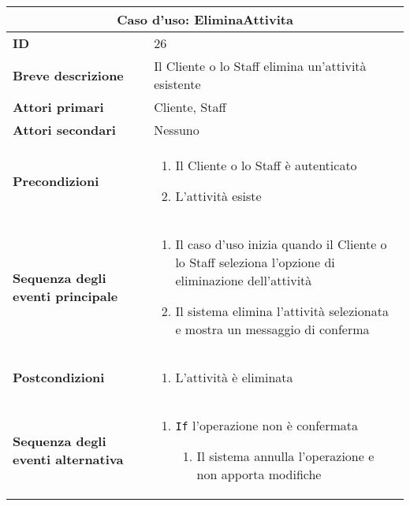 \documentclass[a4paper]{report}
\begin{document}
\clearpage
\begin{table}[H]
\vspace*{-0cm}
\renewcommand{\arraystretch}{1.9}
\begin{tabular}{|p{3.9cm}|p{9.9cm}|}
\hline
\multicolumn{2}{|c|}{\textbf{Caso d’uso: EliminaAttivita}} \\ \hline
	\textbf{ID} & 26 \\ \hline
	\textbf{Breve descrizione} & Il Cliente o lo Staff elimina un’attività esistente \\ \hline
	\textbf{Attori primari} & Cliente, Staff \\ \hline
	\textbf{Attori secondari} & Nessuno \\ \hline
	\textbf{Precondizioni} & \begin{enumerate}[leftmargin=14pt,label=\arabic*.,labelsep=0.5em,topsep=0pt,partopsep=0pt,parsep=0pt,itemsep=0pt]
    \item Il Cliente o lo Staff è autenticato
    \item L’attività esiste
\end{enumerate} \\ \hline
	\textbf{Sequenza degli eventi principale} & \begin{enumerate}[leftmargin=14pt,label=\arabic*.,labelsep=0.5em,topsep=0pt,partopsep=0pt,parsep=0pt,itemsep=0pt]
    \item Il caso d'uso inizia quando il Cliente o lo Staff seleziona l'opzione di eliminazione dell'attività
    \item Il sistema elimina l’attività selezionata e mostra un messaggio di conferma
\end{enumerate} \\ \hline
	\textbf{Postcondizioni} & \begin{enumerate}[label=\arabic*.,leftmargin=14pt,labelsep=0.5em,topsep=0pt,partopsep=0pt,parsep=0pt,itemsep=0pt]
        \item L’attività è eliminata
    \end{enumerate} \\ \hline
	\textbf{Sequenza degli eventi alternativa} & \begin{enumerate}[leftmargin=14pt,label=\arabic*.,labelsep=0.5em,topsep=0pt,partopsep=0pt,parsep=0pt,itemsep=0pt]
    \item \texttt{If} l'operazione non è confermata
    \begin{enumerate}[label=\arabic{enumi}.\arabic*.,leftmargin=22pt,labelsep=0.5em,topsep=0pt,partopsep=0pt,parsep=0pt,itemsep=0pt]
        \item Il sistema annulla l’operazione e non apporta modifiche
    \end{enumerate}
\end{enumerate} \\ \hline
\end{tabular}
\end{table}
\end{document}
